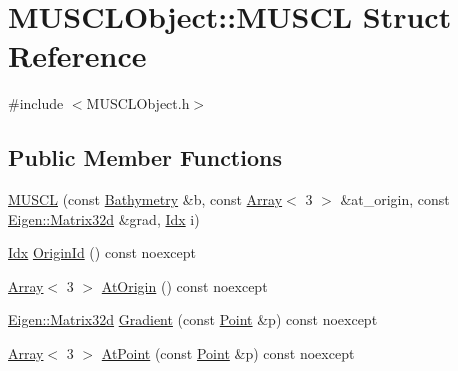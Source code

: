 \hypertarget{structMUSCLObject_1_1MUSCL}{}\section{M\+U\+S\+C\+L\+Object\+:\+:M\+U\+S\+CL Struct Reference}
\label{structMUSCLObject_1_1MUSCL}


{\ttfamily \#include $<$M\+U\+S\+C\+L\+Object.\+h$>$}

\subsection*{Public Member Functions}
\begin{DoxyCompactItemize}
\item 
\hyperlink{structMUSCLObject_1_1MUSCL_a6942ffba4a04bf862ffde0cf2f5e83b2}{M\+U\+S\+CL} (const \hyperlink{structBathymetry}{Bathymetry} \&b, const \hyperlink{Includes_8h_abd9de33944f934950000c3929e14ad8d}{Array}$<$ 3 $>$ \&at\+\_\+origin, const \hyperlink{namespaceEigen_a4bc13f7bc164b152307bec23b85f81ab}{Eigen\+::\+Matrix32d} \&grad, \hyperlink{Includes_8h_ae78891cd308078a2f5f9e7193065c805}{Idx} i)
\item 
\hyperlink{Includes_8h_ae78891cd308078a2f5f9e7193065c805}{Idx} \hyperlink{structMUSCLObject_1_1MUSCL_a9771d52697018e7ac21f7efda3b83cfa}{Origin\+Id} () const noexcept
\item 
\hyperlink{Includes_8h_abd9de33944f934950000c3929e14ad8d}{Array}$<$ 3 $>$ \hyperlink{structMUSCLObject_1_1MUSCL_a2f354621ea19c98d2075e0639a5aa9ae}{At\+Origin} () const noexcept
\item 
\hyperlink{namespaceEigen_a4bc13f7bc164b152307bec23b85f81ab}{Eigen\+::\+Matrix32d} \hyperlink{structMUSCLObject_1_1MUSCL_a98ef757184c44ec59d727ee0ce334aa0}{Gradient} (const \hyperlink{PointOperations_8h_a71a59e5a162c0274a9af106af82cf198}{Point} \&p) const noexcept
\item 
\hyperlink{Includes_8h_abd9de33944f934950000c3929e14ad8d}{Array}$<$ 3 $>$ \hyperlink{structMUSCLObject_1_1MUSCL_a0c36e1cfb8c484ec79a7b44000ebd820}{At\+Point} (const \hyperlink{PointOperations_8h_a71a59e5a162c0274a9af106af82cf198}{Point} \&p) const noexcept
\end{DoxyCompactItemize}
